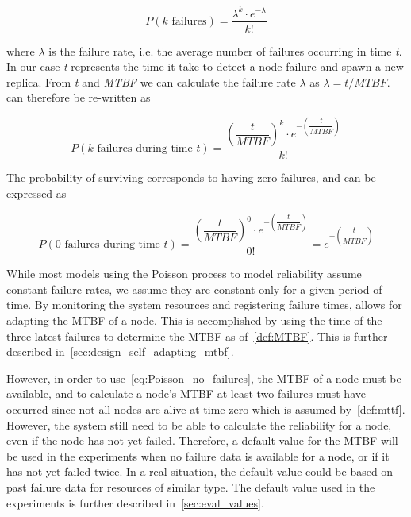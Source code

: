 \documentclass{cslthse-msc}
\begin{document}
\begin{equation} \label{eq:Poisson}
P(k \mbox{ failures}) = \dfrac{\lambda^k \cdot e^{-\lambda}}{k!}
\end{equation}

where $\lambda$ is the failure rate, i.e. the average number of failures occurring in time \emph{t}. In our case \emph{t} represents the time it take to detect a node failure and spawn a new replica. From \emph{t} and \emph{MTBF} we can calculate the failure rate $\lambda$ as $\lambda = t/MTBF$.  can therefore be re-written as

\begin{equation} \label{eq:Poisson_during_time_t}
P(k \mbox{ failures during time } t) = \dfrac{\left(\dfrac{t}{MTBF}\right)^k \cdot e^{-\left(\dfrac{t}{MTBF}\right)}}{k!}
\end{equation}

The probability of surviving corresponds to having zero failures, and can be expressed as

\begin{equation} \label{eq:Poisson_no_failures}
P(0 \mbox{ failures during time } t) = \dfrac{\left(\dfrac{t}{MTBF}\right)^0 \cdot e^{-\left(\dfrac{t}{MTBF}\right)}}{0!} = e^{-\left(\dfrac{t}{MTBF}\right)}
\end{equation}

While most models using the Poisson process to model reliability assume constant failure rates, we assume they are constant only for a given period of time. By monitoring the system resources and registering failure times, allows for adapting the MTBF of a node. This is accomplished by using the time of the three latest failures to determine the MTBF as of~\cref{def:MTBF}. This is further described in~\cref{sec:design_self_adapting_mtbf}. 

However, in order to use~\cref{eq:Poisson_no_failures}, the MTBF of a node must be available, and to calculate a node's MTBF at least two failures must have occurred since not all nodes are alive at time zero which is assumed by~\cref{def:mttf}. However, the system still need to be able to calculate the reliability for a node, even if the node has not yet failed. Therefore, a default value for the MTBF will be used in the experiments when no failure data is available for a node, or if it has not yet failed twice. In a real situation, the default value could be based on past failure data for resources of similar type. The default value used in the experiments is further described in~\cref{sec:eval_values}.
\end{document}
